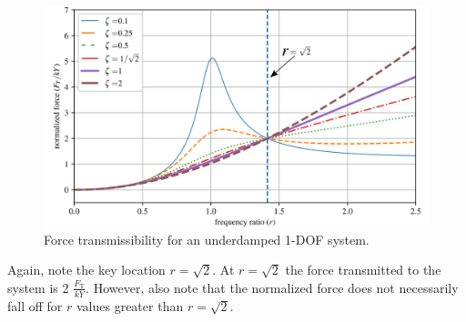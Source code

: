 \documentclass[12pt,letter]{article}
\begin{document}
		\begin{figure}[H]
			\centering
			\includegraphics[]{../figures/base_excitation_force_transmissibility.png}
			\caption{Force transmissibility for an underdamped 1-DOF system.}
		\end{figure}
		Again, note the key location $r=\sqrt{2}$. At $r=\sqrt{2}$ the force transmitted to the system is 2 $\frac{F_\text{T}}{kY}$. However, also note that the normalized force does not necessarily fall off for $r$ values greater than $r=\sqrt{2}$.  
\end{document}
